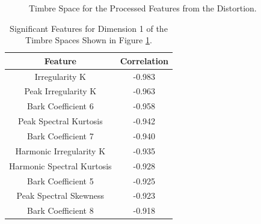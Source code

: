 	\begin{figure}[h!]
		\centering
		\qquad
		\caption{Timbre Space for the Processed Features from the Distortion.}
		\label{fig:DistortionProcessedMDSs}
	\end{figure}

	\begin{table}[h!]
		\centering
		\begin{tabular}{|c|c|}
			\hline
			\bf{Feature} & \bf{Correlation} \\
			\hline
			\hline
			Irregularity K & -0.983 \\
			\hline
			Peak Irregularity K & -0.963 \\
			\hline
			Bark Coefficient 6 & -0.958 \\
			\hline
			Peak Spectral Kurtosis & -0.942 \\
			\hline
			Bark Coefficient 7 & -0.940 \\
			\hline
			Harmonic Irregularity K & -0.935 \\
			\hline
			Harmonic Spectral Kurtosis & -0.928 \\
			\hline
			Bark Coefficient 5 & -0.925 \\
			\hline
			Peak Spectral Skewness & -0.923 \\
			\hline
			Bark Coefficient 8 & -0.918 \\
			\hline
		\end{tabular}
		\caption{Significant Features for Dimension 1 of the Timbre Spaces Shown in Figure 
			 \ref{fig:DistortionProcessedMDSs}.}
		\label{tab:DistortionProcessedFeaturesDim1}
	\end{table}

